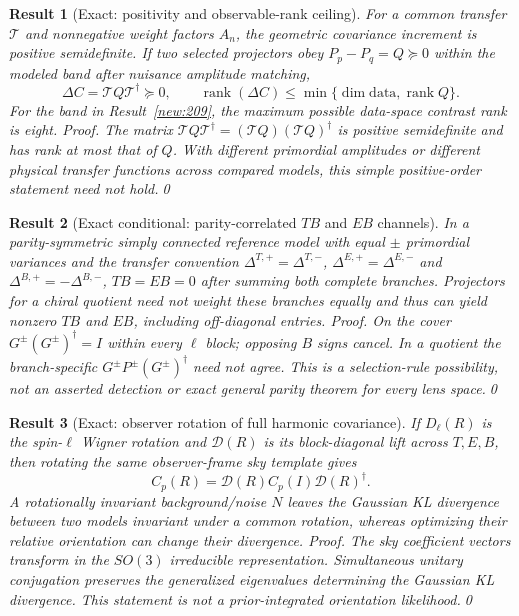 \documentclass[aps,prd,onecolumn,notitlepage,groupedaddress,11pt]{revtex4-2}
\newtheorem{result}{Result}
\begin{document}
\begin{result}[\textsf{Exact}: positivity and observable-rank ceiling]\label{new:210}
For a common transfer $\mathcal T$ and nonnegative weight factors $A_n$, the geometric covariance increment is positive semidefinite. If two selected projectors obey $P_p-P_q=Q\succeq0$ within the modeled band after nuisance amplitude matching,
\begin{equation}\label{eq:ranktransfer}
\Delta C=\mathcal T Q\mathcal T^\dagger\succeq0,\qquad
\operatorname{rank}(\Delta C)\le\min\{\dim\mathrm{data},\operatorname{rank}Q\}.
\end{equation}
For the band in Result~\ref{new:209}, the maximum possible data-space contrast rank is eight. \textit{Proof.} The matrix $\mathcal TQ\mathcal T^\dagger=(\mathcal TQ)(\mathcal TQ)^\dagger$ is positive semidefinite and has rank at most that of $Q$. With different primordial amplitudes or different physical transfer functions across compared models, this simple positive-order statement need not hold.\qed
\end{result}

\begin{result}[\textsf{Exact conditional}: parity-correlated $TB$ and $EB$ channels]\label{new:211}
In a parity-symmetric simply connected reference model with equal $\pm$ primordial variances and the transfer convention $\Delta^{T,+}=\Delta^{T,-}$, $\Delta^{E,+}=\Delta^{E,-}$ and $\Delta^{B,+}=-\Delta^{B,-}$, $TB=EB=0$ after summing both complete branches. Projectors for a chiral quotient need not weight these branches equally and thus can yield nonzero $TB$ and $EB$, including off-diagonal entries.
\textit{Proof.} On the cover $G^\pm(G^\pm)^\dagger=I$ within every $\ell$ block; opposing $B$ signs cancel. In a quotient the branch-specific $G^\pm P^\pm(G^\pm)^\dagger$ need not agree. This is a selection-rule possibility, not an asserted detection or exact general parity theorem for every lens space.\qed
\end{result}

\begin{result}[\textsf{Exact}: observer rotation of full harmonic covariance]\label{new:212}
If $D_\ell(R)$ is the spin-$\ell$ Wigner rotation and $\mathcal D(R)$ is its block-diagonal lift across $T,E,B$, then rotating the same observer-frame sky template gives
\begin{equation}\label{eq:rotatecov}
C_p(R)=\mathcal D(R)C_p(I)\mathcal D(R)^\dagger.
\end{equation}
A rotationally invariant background/noise $N$ leaves the Gaussian KL divergence between two models invariant under a \emph{common} rotation, whereas optimizing their \emph{relative} orientation can change their divergence. \textit{Proof.} The sky coefficient vectors transform in the $SO(3)$ irreducible representation. Simultaneous unitary conjugation preserves the generalized eigenvalues determining the Gaussian KL divergence. This statement is not a prior-integrated orientation likelihood.\qed
\end{result}
\end{document}

